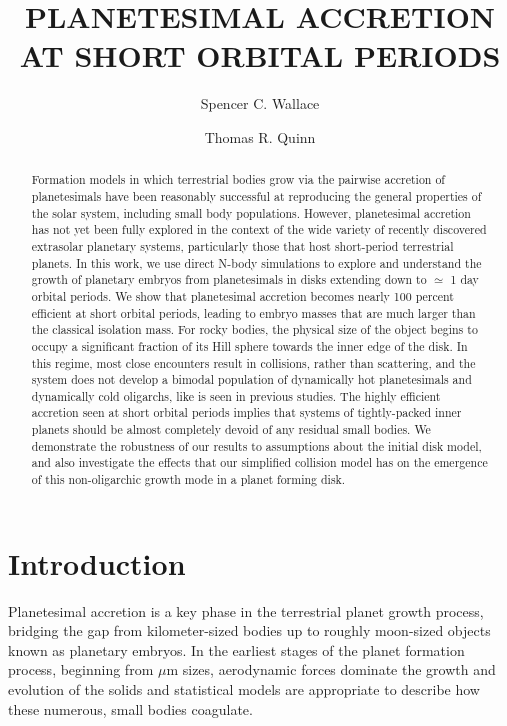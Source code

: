 \documentclass[twocolumn,linenumbers]{aastex63}
\begin{document}
\title{PLANETESIMAL ACCRETION AT SHORT ORBITAL PERIODS}

\author{Spencer C. Wallace}

\author{Thomas R. Quinn}

\begin{abstract}
Formation models in which terrestrial bodies grow via the pairwise
accretion of planetesimals have been reasonably successful at
reproducing the general properties of the solar system, including
small body populations. However, planetesimal accretion has not yet
been fully explored in the context of the wide variety of recently discovered extrasolar planetary systems,
particularly those that host short-period terrestrial planets. In this work, we
use direct N-body simulations to explore and understand the growth of
planetary embryos from planetesimals in disks extending down to
$\simeq$ 1 day orbital periods. We show that planetesimal accretion
becomes nearly 100 percent efficient at short orbital periods, leading
to embryo masses that are much larger than the classical
isolation mass. For rocky bodies, the physical size of the object
begins to occupy a significant fraction of its Hill sphere towards the inner edge of the disk. In this regime, most close encounters
result in collisions, rather than scattering, and the system does not
develop a bimodal population of dynamically hot planetesimals and
dynamically cold oligarchs, like is seen in previous studies. The highly
efficient accretion seen at short orbital periods implies that systems
of tightly-packed inner planets should be almost completely devoid of
any residual small bodies. We demonstrate the robustness of our
results to assumptions about the initial disk model, and also
investigate the effects that our simplified collision model has on the emergence
of this non-oligarchic growth mode in a planet forming disk.
\end{abstract}

\section{Introduction} \label{sec:intro}

Planetesimal accretion is a key phase in the terrestrial planet growth
process, bridging the gap from kilometer-sized bodies up to roughly
moon-sized objects known as planetary embryos. In the earliest stages
of the planet formation process, beginning from $\mu$m sizes, aerodynamic forces dominate the
growth and evolution of the solids and statistical models
\citep{johansen14, birnstiel16} are appropriate to describe how these
numerous, small bodies coagulate. 
\end{document}
